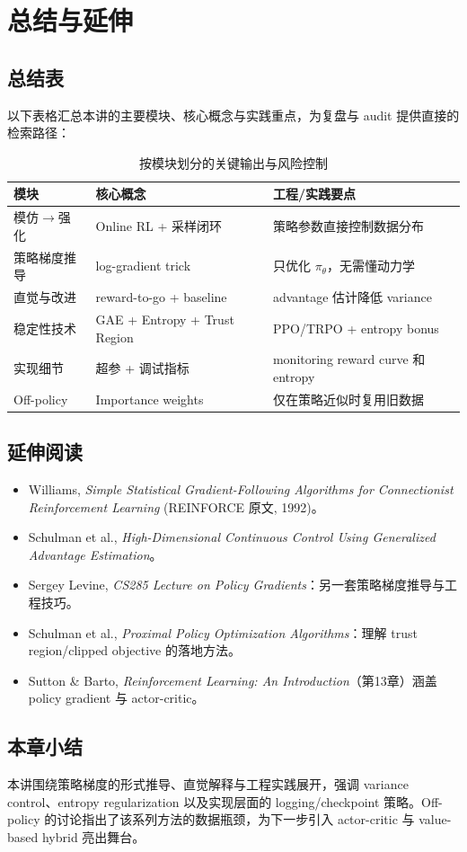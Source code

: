 \section{总结与延伸}

\subsection{总结表}
以下表格汇总本讲的主要模块、核心概念与实践重点，为复盘与 audit 提供直接的检索路径：

\begin{table}[H]
\centering
\small
\begin{tabular}{p{}p{}p{}}
\toprule
模块 & 核心概念 & 工程/实践要点 \\
\midrule
模仿\(\to\)强化 & Online RL + 采样闭环 & 策略参数直接控制数据分布 \\
策略梯度推导 & log-gradient trick & 只优化 \(\pi_\theta\)，无需懂动力学 \\
直觉与改进 & reward-to-go + baseline & advantage 估计降低 variance \\
稳定性技术 & GAE + Entropy + Trust Region & PPO/TRPO + entropy bonus \\
实现细节 & 超参 + 调试指标 & monitoring reward curve 和 entropy \\
Off-policy & Importance weights & 仅在策略近似时复用旧数据 \\
\bottomrule
\end{tabular}
\caption{按模块划分的关键输出与风险控制}
\end{table}

\subsection{延伸阅读}
\begin{itemize}
    \item Williams, \textit{Simple Statistical Gradient-Following Algorithms for Connectionist Reinforcement Learning} (REINFORCE 原文, 1992)。
    \item Schulman et al., \textit{High-Dimensional Continuous Control Using Generalized Advantage Estimation}。
    \item Sergey Levine, \textit{CS285 Lecture on Policy Gradients}：另一套策略梯度推导与工程技巧。
    \item Schulman et al., \textit{Proximal Policy Optimization Algorithms}：理解 trust region/clipped objective 的落地方法。
    \item Sutton \& Barto, \textit{Reinforcement Learning: An Introduction}（第13章）涵盖 policy gradient 与 actor-critic。
\end{itemize}

\subsection{本章小结}
本讲围绕策略梯度的形式推导、直觉解释与工程实践展开，强调 variance control、entropy regularization 以及实现层面的 logging/checkpoint 策略。Off-policy 的讨论指出了该系列方法的数据瓶颈，为下一步引入 actor-critic 与 value-based hybrid 亮出舞台。


